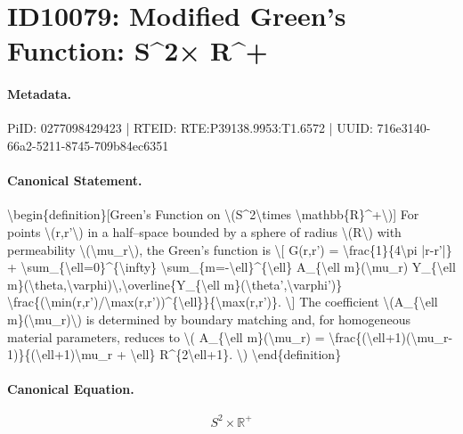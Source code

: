 \section*{ID10079: Modified Green’s Function: S\textasciicircum{}2× R\textasciicircum{}+}
\paragraph{Metadata.}
PiID: 0277098429423 | RTEID: RTE:P39138.9953:T1.6572 | UUID: 716e3140-66a2-5211-8745-709b84ec6351

\paragraph{Canonical Statement.}
\textbackslash{}begin\{definition\}[Green’s Function on \textbackslash{}(S\textasciicircum{}2\textbackslash{}times \textbackslash{}mathbb\{R\}\textasciicircum{}+\textbackslash{})] For points \textbackslash{}(r,r'\textbackslash{}) in a half–space bounded by a sphere of radius \textbackslash{}(R\textbackslash{}) with permeability \textbackslash{}(\textbackslash{}mu\_r\textbackslash{}), the Green’s function is \textbackslash{}[ G(r,r') = \textbackslash{}frac\{1\}\{4\textbackslash{}pi |r-r'|\} + \textbackslash{}sum\_\{\textbackslash{}ell=0\}\textasciicircum{}\{\textbackslash{}infty\} \textbackslash{}sum\_\{m=-\textbackslash{}ell\}\textasciicircum{}\{\textbackslash{}ell\} A\_\{\textbackslash{}ell m\}(\textbackslash{}mu\_r) Y\_\{\textbackslash{}ell m\}(\textbackslash{}theta,\textbackslash{}varphi)\textbackslash{},\textbackslash{}overline\{Y\_\{\textbackslash{}ell m\}(\textbackslash{}theta',\textbackslash{}varphi')\} \textbackslash{}frac\{(\textbackslash{}min(r,r')/\textbackslash{}max(r,r'))\textasciicircum{}\{\textbackslash{}ell\}\}\{\textbackslash{}max(r,r')\}. \textbackslash{}] The coefficient \textbackslash{}(A\_\{\textbackslash{}ell m\}(\textbackslash{}mu\_r)\textbackslash{}) is determined by boundary matching and, for homogeneous material parameters, reduces to \textbackslash{}( A\_\{\textbackslash{}ell m\}(\textbackslash{}mu\_r) = \textbackslash{}frac\{(\textbackslash{}ell+1)(\textbackslash{}mu\_r-1)\}\{(\textbackslash{}ell+1)\textbackslash{}mu\_r + \textbackslash{}ell\} R\textasciicircum{}\{2\textbackslash{}ell+1\}. \textbackslash{}) \textbackslash{}end\{definition\}

\paragraph{Canonical Equation.}
\[
S^2\times \mathbb{R}^+
\]

